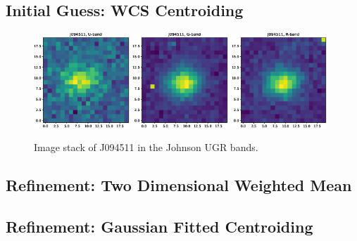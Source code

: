 \documentclass[a4paper,11pt]{article}
\begin{document}
\subsection{Initial Guess: WCS Centroiding}

\begin{figure}[H]
    \includegraphics[width=0.32\textwidth]{wcs_centroid_U_stack.eps}
    \includegraphics[width=0.32\textwidth]{wcs_centroid_G_stack.eps}
    \includegraphics[width=0.32\textwidth]{wcs_centroid_R_stack.eps}
    \caption{Image stack of J094511 in the Johnson UGR bands.}
    \label{fig:wcs_centroids}
\end{figure}

\subsection{Refinement: Two Dimensional Weighted Mean}
\subsection{Refinement: Gaussian Fitted Centroiding}
\end{document}
